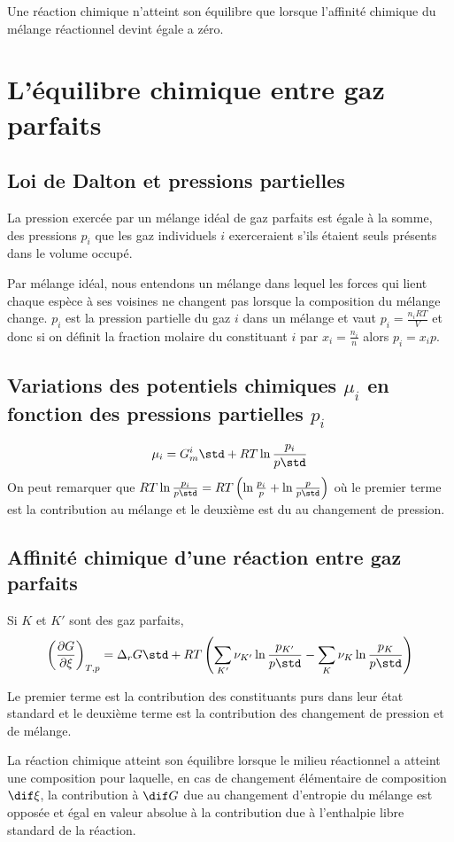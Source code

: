 Une réaction chimique n'atteint son équilibre que lorsque
l'affinité chimique du mélange réactionnel devint égale a zéro.

\section{L'équilibre chimique entre gaz parfaits}
\subsection{Loi de Dalton et pressions partielles}
La pression exercée par un mélange idéal de gaz parfaits est égale à la somme,
des pressions $p_i$ que les gaz individuels
$i$ exerceraient s'ils étaient seuls présents dans le volume occupé.

Par mélange idéal,
nous entendons un mélange dans lequel les forces qui lient chaque espèce
à ses voisines ne changent pas lorsque la composition du mélange change.
$p_i$ est la pression partielle du gaz $i$ dans un mélange et vaut
$p_i = \frac{n_iRT}{V}$ et donc si on définit la fraction molaire
du constituant $i$ par $x_i = \frac{n_i}{n}$ alors $p_i = x_ip$.

\subsection{Variations des potentiels chimiques $\mu_i$
en fonction des pressions partielles $p_i$}
\[ \mu_i = {G_m^i}\std+RT \ln \frac{p_i}{p\std} \]
On peut remarquer que $RT \ln \frac{p_i}{p\std} =
RT \left(\ln \frac{p_i}{p} + \ln \frac{p}{p\std}\right)$
où le premier terme est la contribution au mélange et
le deuxième est du au changement de pression.

\subsection{Affinité chimique d'une réaction entre gaz parfaits}
Si $K$ et $K'$ sont des gaz parfaits,
\begin{equation}
  \label{eq:AGRTln}
  \left(\frac {\partial G}{\partial \xi}\right)_{T,p} =
  \Delta_rG\std+RT\left(\sum_{K'}\nu_{K'} \ln \frac{p_{K'}}{p\std}-
  \sum_{K}\nu_{K} \ln \frac{p_{K}}{p\std}\right)
\end{equation}

Le premier terme est la contribution des constituants purs
dans leur état standard et le deuxième terme est
la contribution des changement de pression et de mélange.

La réaction chimique atteint son équilibre lorsque le milieu réactionnel
a atteint une composition pour laquelle, en cas de changement élémentaire
de composition $\dif\xi$, la contribution à $\dif G$ due au changement
d'entropie du mélange est opposée et égal en valeur absolue
à la contribution due à l'enthalpie libre standard de la réaction.

